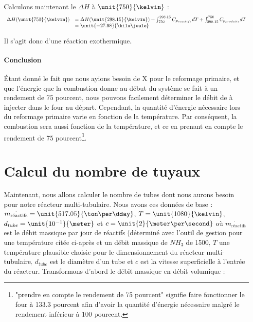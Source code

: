 Calculons maintenant le $\Delta H$ à $\unit{750}{\kelvin}$ :			
$$
	\begin{array}{rl}
		 	 \Delta H(\unit{750}{\kelvin})	&=  \Delta H(\unit{298.15}{\kelvin}) 
																							+ \int_{750}^{298.15} C_{p_{reactifs}} dT + \int_{298.15}^{750} C_{p_{produits}} dT \\
																				&=  \unit{-27.98}{\kilo\joule}
	\end{array}
$$	
	
Il s'agit donc d'une réaction exothermique.

\paragraph{Conclusion}
\'Etant donné le fait que nous ayions besoin de \unit{X}{\kilo\joule} pour le reformage primaire, et que l'énergie
que la combustion donne au début du système se fait à un rendement de 75 pourcent, nous pouvons facilement déterminer
le débit de  à injecter dans le four au départ. Cependant, la quantité d'énergie nécessaire lors du
reformage primaire varie en fonction de la température. Par conséquent, la combustion sera aussi fonction de la température,
et ce en prenant en compte le rendement de 75 pourcent\footnote{"prendre en compte le rendement de 75 pourcent" signifie faire
fonctionner le four à 133.3 pourcent afin d'avoir la quantité d'énergie nécessaire malgré le rendement inférieur 
à 100 pourcent.}.

\section{Calcul du nombre de tuyaux}
Maintenant, nous allons calculer le nombre de tubes dont nous aurons besoin pour
notre réacteur multi-tubulaire. Nous avons ces données de base : $\dot{m_{\text{réactifs}}} = \unit{517.05}{\ton\per\dday}$, 
$T = \unit{1080}{\kelvin}$, $d_{tube} = \unit{10^{-1}}{\meter}$ et $c = \unit{2}{\meter\per\second}$ où $\dot{m_{\text{réactifs}}}$ 
est le débit massique par jour de réactifs (déterminé avec l'outil de gestion pour une température citée ci-après et
un débit massique de $NH_{3}$ de \unit{1500}{\ton\per\dday}, $T$ une température plausible choisie pour le dimensionnement
du réacteur multi-tubulaire, $d_{tube}$ est le diamètre d'un tube et $c$ est la vitesse superficielle à l'entrée du réacteur.
Transformons d'abord le débit massique en débit volumique :

